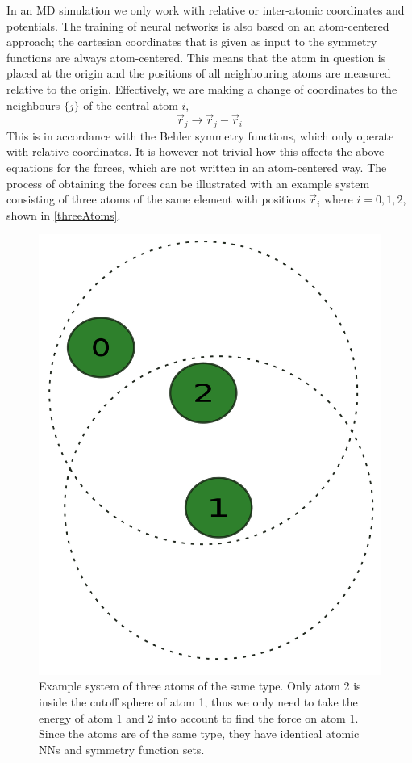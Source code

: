 \documentclass[twoside,english]{uiofysmaster}
\begin{document}
In an MD simulation we only work with relative or inter-atomic coordinates and potentials. 
The training of neural networks is also based on an atom-centered approach; the cartesian coordinates
that is given as input to the symmetry functions are always atom-centered. This means that the atom
in question is placed at the origin and the positions of all neighbouring atoms are measured relative to 
the origin. Effectively, we are making a change of coordinates to the neighbours $\{j\}$ of the central atom $i$,
\begin{equation}
 \vec{r}_j \rightarrow \vec{r}_j - \vec{r}_i
 \label{changeOfCoordinates}
\end{equation}
This is in accordance with the Behler symmetry functions, which only operate with relative coordinates. 
It is however not trivial how this affects the above equations for the forces, which are not written in 
an atom-centered way. The process of obtaining the forces can be illustrated with an example system
consisting of three atoms of the same element with positions $\vec{r}_i$ where $i = 0,1,2$, shown in \autoref{threeAtoms}.
\begin{figure}[H]
\begin{center}
  \includegraphics[width = 0.9\linewidth]{Figures/Implementation/3atoms.pdf}
  \caption{Example system of three atoms of the same type. Only atom 2 is inside the cutoff sphere of atom 1, thus we only need to 
	   take the energy of atom 1 and 2 into account to find the force on atom 1. Since the atoms are of the same type,
	   they have identical atomic NNs and symmetry function sets.}
  \label{fig:threeAtoms}
  \end{center}
\end{figure}
\end{document}
